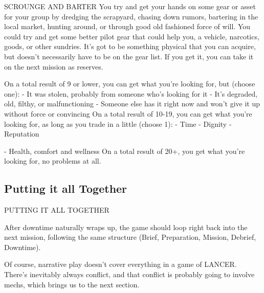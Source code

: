 SCROUNGE AND BARTER
You try and get your hands on some gear or asset for your group by dredging the scrapyard,
chasing down rumors, bartering in the local market, hunting around, or through good old
fashioned force of will. You could try and get some better pilot gear that could help you, a vehicle,
narcotics, goods, or other sundries. It’s got to be something physical that you can acquire, but
doesn’t necessarily have to be on the gear list. If you get it, you can take it on the next mission as
reserves.

On a total result of 9 or lower, you can get what you’re looking for, but (choose one):
    -    It was stolen, probably from someone who’s looking for it
    -    It’s degraded, old, filthy, or malfunctioning
    -    Someone else has it right now and won’t give it up without force or convincing
On a total result of 10-19, you can get what you’re looking for, as long as you trade in a little
(choose 1):
    -    Time
    -    Dignity
    -    Reputation




     -   Health, comfort and wellness
On a total result of 20+, you get what you’re looking for, no problems at all.

\subsection{Putting it all Together}
                                    PUTTING IT ALL TOGETHER

After downtime naturally wraps up, the game should loop right back into the next mission,
following the same structure (Brief, Preparation, Mission, Debrief, Downtime).

Of course, narrative play doesn’t cover everything in a game of LANCER. There’s inevitably
always conflict, and that conflict is probably going to involve mechs, which brings us to the next
section.
